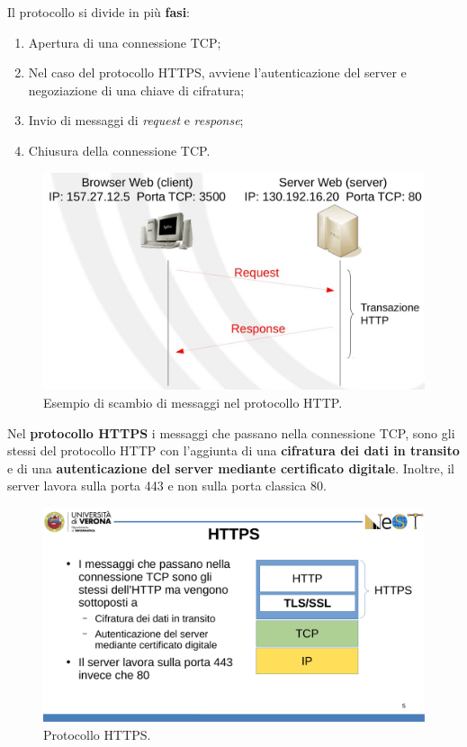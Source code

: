 \documentclass[a4paper]{article}
\begin{document}
	\noindent
	Il protocollo si divide in più \textbf{fasi}:
	\begin{enumerate}
		\item Apertura di una connessione TCP;
		
		\item Nel caso del protocollo HTTPS, avviene l'autenticazione del server e negoziazione di una chiave di cifratura;
		
		\item Invio di messaggi di \emph{request} e \emph{response};
		
		\item Chiusura della connessione TCP.
	\end{enumerate}
	\begin{figure}[!htp]
		\centering
		\includegraphics[width=\textwidth]{img/protocollo_http-https.png}
		\caption{Esempio di scambio di messaggi nel protocollo HTTP.}
	\end{figure}\newpage
	
	\noindent
	Nel \textcolor{Red3}{\textbf{protocollo HTTPS}} i messaggi che passano nella connessione TCP, sono gli stessi del protocollo HTTP con l'aggiunta di una \textbf{cifratura dei dati in transito} e di una \textbf{autenticazione del server mediante certificato digitale}. Inoltre, il server lavora sulla porta 443 e non sulla porta classica 80.
	\begin{figure}[!htp]
		\centering
		\includegraphics[width=.4\textwidth]{img/protocollo_https.pdf}
		\caption{Protocollo HTTPS.}
	\end{figure}
\end{document}
